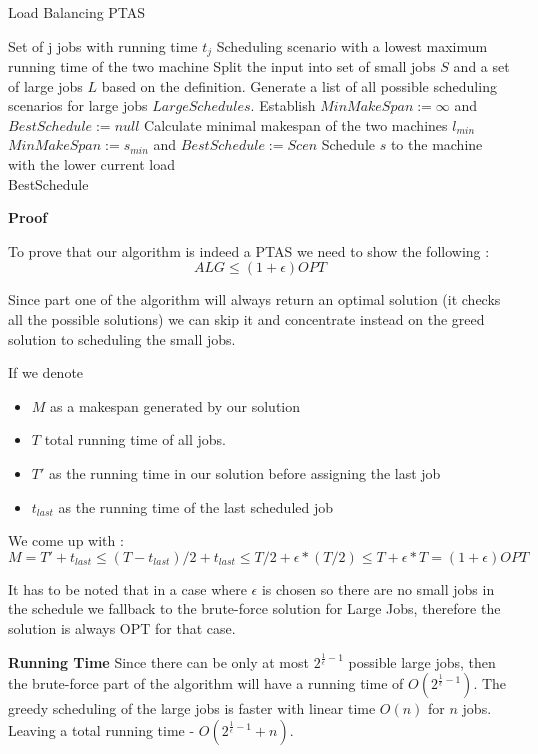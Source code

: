 \begin{algorithm}[H]
  \caption{Load Balancing PTAS}
  \label{alg:load_balancing_ptas}
  \begin{algorithmic}
    \Require Set of j jobs with running time $t_j$
    \Ensure Scheduling scenario with a lowest maximum running time of the two machine 
    \renewcommand{\algorithmicrequire}{\textbf{Input:}}
    \renewcommand{\algorithmicensure}{\textbf{Output:}}
    \algnewcommand{}
    \algnewcommand\Operation{\item[\algorithmicoperation]}
    \Operation
    \State Split the input into set of small jobs $ S $ and a set of large jobs $ L $  based on the definition.
    \State Generate a list of all possible scheduling scenarios for large jobs $ LargeSchedules $.
    \State Establish $ MinMakeSpan := \infty $ and $ BestSchedule:= null $
    \State Calculate minimal makespan of the two machines $ l_{min} $
    \State $ MinMakeSpan := s_{min} $ and $ BestSchedule := Scen $
    \EndIf
    \EndFor
    \State Schedule $ s $ to the machine with the lower current load
    \EndFor\\
    \Return BestSchedule
  \end{algorithmic}
\end{algorithm}

\textbf{Proof}

To prove that our algorithm is indeed a PTAS we need to show the following :
$$ ALG \le (1 + \epsilon ) OPT $$ 

Since part one of the algorithm will always return an optimal solution (it checks all 
the possible solutions) we can skip it and concentrate instead on the greed solution
to scheduling the small jobs.

If we denote 
\begin{itemize}
	\item $ M $ as a makespan generated by our solution
	\item $ T $ total running time of all jobs.
	\item $ T' $ as the running time in our solution before assigning the last job
	\item $ t_{last} $ as the running time of the last scheduled job
\end{itemize}
We come up with :
$$ M = T' + t_{last} \le ( T - t_{last} )/2 + t_{last} \le T/2 + \epsilon * (T/2) \le T + \epsilon * T = (1 + \epsilon ) OPT $$

It has to be noted that in a case where $ \epsilon $ is chosen so there are no small jobs in the schedule we fallback to the brute-force solution for Large Jobs, therefore the solution is always OPT for that case.

\textbf{Running Time}
Since there can be only at most $ 2^{\frac{1}{\epsilon}-1} $ possible large jobs, then the brute-force part of the algorithm will have a running time of $ O(2^{\frac{1}{\epsilon}-1}) $. The greedy scheduling of the large jobs is faster with linear time $ O(n) $ for $ n $ jobs. Leaving a total running time - $ O(2^{\frac{1}{\epsilon}-1} + n) $.

